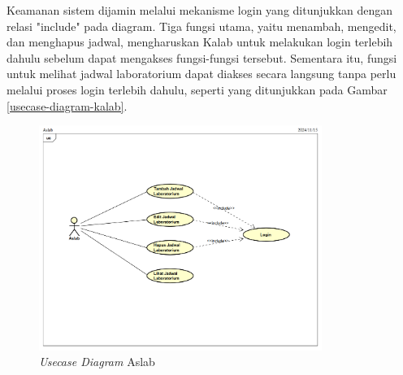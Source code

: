 Keamanan sistem dijamin melalui mekanisme login yang ditunjukkan dengan relasi "include" pada diagram. Tiga fungsi utama, yaitu menambah, mengedit, dan menghapus jadwal, mengharuskan Kalab untuk melakukan login terlebih dahulu sebelum dapat mengakses fungsi-fungsi tersebut. Sementara itu, fungsi untuk melihat jadwal laboratorium dapat diakses secara langsung tanpa perlu melalui proses login terlebih dahulu, seperti yang ditunjukkan pada Gambar \ref{usecase-diagram-kalab}.
\begin{figure}
	\centering
	\includegraphics[width=0.82\textwidth]{konten/gambar/usecase-diagram/aslab.png}
	\caption{\textit{Usecase Diagram} Aslab}
	\label{usecase-diagram-aslab}
\end{figure}



